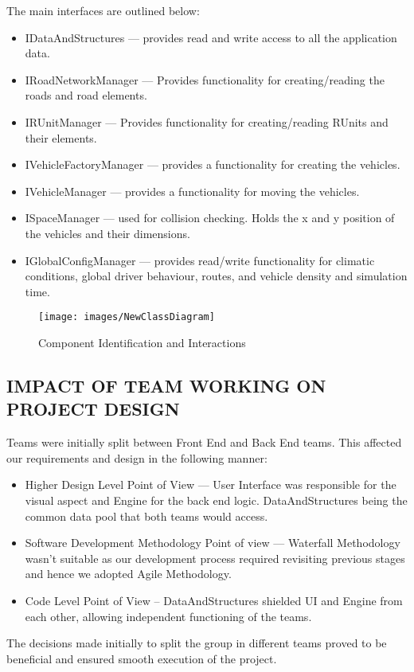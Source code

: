 \documentclass[11pt,a4paper]{article}
\begin{document}
  \setlength{\parindent}{0cm}\bigskip
  The main interfaces are outlined below:
	\begin{itemize}
		\item IDataAndStructures --- provides read and write access to all the application data.
		\item IRoadNetworkManager --- Provides functionality for creating/reading the roads and road elements.
		\item IRUnitManager --- Provides functionality for creating/reading RUnits and their elements.
		\item IVehicleFactoryManager --- provides a functionality for creating the vehicles.
		\item IVehicleManager --- provides a functionality for moving the vehicles.
		\item ISpaceManager --- used for collision checking. Holds the x and y position of the vehicles and their dimensions.
		\item IGlobalConfigManager --- provides read/write functionality for climatic conditions, global driver behaviour, routes, and vehicle density and simulation time.
	\end{itemize}
	
		\begin{figure}[h]
			\texttt{[image: images/NewClassDiagram]}
			\caption{Component Identification and Interactions}
			\centering
		\end{figure}
		
  \subsection{IMPACT OF TEAM WORKING ON PROJECT DESIGN}
  	Teams were initially split between Front End and Back End teams. 
  	This affected our requirements and design in the following manner:
	\begin{itemize}
		\item Higher Design Level Point of View --- User Interface was responsible for the visual aspect and Engine for the back end logic. DataAndStructures being the common data pool that both teams would access.
		\item Software Development Methodology Point of view --- Waterfall Methodology wasn’t suitable as our development process required revisiting previous stages and hence we adopted Agile Methodology.
		\item Code Level Point of View – DataAndStructures shielded UI and Engine from each other, allowing independent functioning of the teams.  
	\end{itemize}
	The decisions made initially to split the group in different teams
	proved to be beneficial and ensured smooth execution of the
	project.
\end{document}
